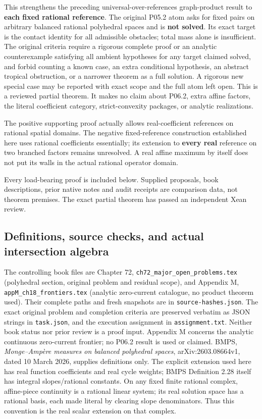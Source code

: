 \documentclass[
  11pt,
]{article}
\begin{document}
This strengthens the preceding universal-over-references graph-product
result to \textbf{each fixed rational reference}. The original P05.2
atom asks for fixed pairs on arbitrary balanced rational polyhedral
spaces and is \textbf{not solved}. Its exact target is the contact
identity for all admissible obstacles; total mass alone is insufficient.
The original criteria require a rigorous complete proof or an analytic
counterexample satisfying all ambient hypotheses for any target claimed
solved, and forbid counting a known case, an extra conditional
hypothesis, an abstract tropical obstruction, or a narrower theorem as a
full solution. A rigorous new special case may be reported with exact
scope and the full atom left open. This is a reviewed partial theorem. It makes no claim about
P06.2, extra affine factors, the literal coefficient category,
strict-convexity packages, or analytic realizations.

The positive supporting proof actually allows real-coefficient
references on rational spatial domains. The negative fixed-reference
construction established here uses rational coefficients essentially;
its extension to \textbf{every real} reference on two branched factors
remains unresolved. A real affine maximum by itself does not put its
walls in the actual rational operator domain.

Every load-bearing proof is included below. Supplied proposals, book
descriptions, prior native notes and audit receipts are comparison data,
not theorem premises. The exact partial theorem has passed an independent Xean review.

\subsection{Definitions, source checks, and actual intersection
algebra}\label{definitions-source-checks-and-actual-intersection-algebra}

The controlling book files are Chapter 72,
\texttt{ch72\_major\_open\_problems.tex} (polyhedral section, original
problem and residual scope), and Appendix M,
\texttt{appM\_ch18\_frontiers.tex} (analytic zero-current catalogue, no
product theorem used). Their complete paths and fresh snapshots are in
\texttt{source-hashes.json}. The exact original problem and completion
criteria are preserved verbatim as JSON strings in \texttt{task.json},
and the execution assignment in \texttt{assignment.txt}. Neither book
status nor prior review is a proof input. Appendix M concerns the
analytic continuous zero-current frontier; no P06.2 result is used or
claimed. BMPS, \emph{Monge--Ampère measures on balanced polyhedral
spaces}, arXiv:2603.08664v1, dated 10 March 2026, supplies definitions
only. The explicit extension used here has real function coefficients
and real cycle weights; BMPS Definition 2.28 itself has integral
slopes/rational constants. On any fixed finite rational complex,
affine-piece continuity is a rational linear system; its real solution
space has a rational basis, each made literal by clearing slope
denominators. Thus this convention is the real scalar extension on that
complex.
\end{document}
